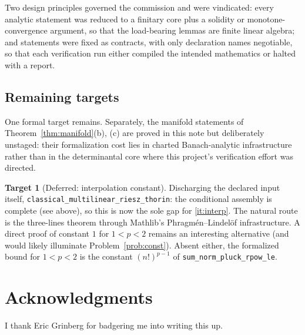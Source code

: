 \documentclass[11pt]{amsart}
\theoremstyle{definition}
\newtheorem{target}{Target}
\begin{document}
Two design principles governed the commission and were vindicated: every analytic statement was reduced to a finitary core plus a solidity or monotone-convergence argument, so that the load-bearing lemmas are finite linear algebra; and statements were fixed as contracts, with only declaration names negotiable, so that each verification run either compiled the intended mathematics or halted with a report.

\subsection*{Remaining targets}
One formal target remains. Separately, the manifold statements of Theorem~\ref{thm:manifold}(b), (c) are proved in this note but deliberately unstaged: their formalization cost lies in charted Banach-analytic infrastructure rather than in the determinantal core where this project's verification effort was directed.

\begin{target}[Deferred: interpolation constant]\label{F:interp}
Discharging the declared input itself, \texttt{classical\_multilinear\_riesz\_thorin}: the conditional assembly is complete (see above), so this is now the sole gap for \ref{it:interp}. The natural route is the three-lines theorem through Mathlib's Phragm\'en--Lindel\"of infrastructure. A direct proof of constant $1$ for $1<p<2$ remains an interesting alternative (and would likely illuminate Problem~\ref{prob:const}). Absent either, the formalized bound for $1<p<2$ is the constant $(n!)^{p-1}$ of \texttt{sum\_norm\_pluck\_rpow\_le}.
\end{target}

\section*{Acknowledgments}
I thank Eric Grinberg for badgering me into writing this up.
\end{document}
